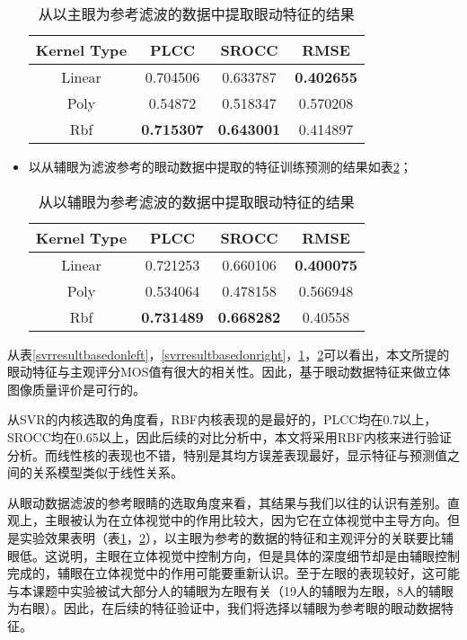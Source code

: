 \begin{itemize}[noitemsep,topsep=0pt,parsep=0pt,partopsep=0pt]
\begin{table}[]
\centering
\caption{从以主眼为参考滤波的数据中提取眼动特征的结果}
\label{svrresultbasedonmaineye}
\begin{tabular}{@{}cccc@{}}
\toprule
Kernel Type & PLCC              & SROCC             & RMSE              \\ \midrule
Linear      & 0.704506          & 0.633787          & \textbf{0.402655} \\
Poly        & 0.54872           & 0.518347          & 0.570208          \\
Rbf         & \textbf{0.715307} & \textbf{0.643001} & 0.414897          \\ \bottomrule
\end{tabular}
\end{table}
\item 以从辅眼为滤波参考的眼动数据中提取的特征训练预测的结果如表\ref{svrresultbasedonnomaineye}；
\begin{table}[]
\centering
\caption{从以辅眼为参考滤波的数据中提取眼动特征的结果}
\label{svrresultbasedonnomaineye}
\begin{tabular}{@{}cccc@{}}
\toprule
Kernel Type & PLCC              & SROCC             & RMSE              \\ \midrule
Linear      & 0.721253          & 0.660106          & \textbf{0.400075} \\
Poly        & 0.534064          & 0.478158          & 0.566948          \\
Rbf         & \textbf{0.731489} & \textbf{0.668282} & 0.40558           \\ \bottomrule
\end{tabular}
\end{table}
\end{itemize}

从表\ref{svrresultbasedonleft}，\ref{svrresultbasedonright}，\ref{svrresultbasedonmaineye}，\ref{svrresultbasedonnomaineye}可以看出，本文所提的眼动特征与主观评分MOS值有很大的相关性。因此，基于眼动数据特征来做立体图像质量评价是可行的。

从SVR的内核选取的角度看，RBF内核表现的是最好的，PLCC均在0.7以上，SROCC均在0.65以上，因此后续的对比分析中，本文将采用RBF内核来进行验证分析。而线性核的表现也不错，特别是其均方误差表现最好，显示特征与预测值之间的关系模型类似于线性关系。

从眼动数据滤波的参考眼睛的选取角度来看，其结果与我们以往的认识有差别。直观上，主眼被认为在立体视觉中的作用比较大，因为它在立体视觉中主导方向。但是实验效果表明（表\ref{svrresultbasedonmaineye}，\ref{svrresultbasedonnomaineye}），以主眼为参考的数据的特征和主观评分的关联要比辅眼低。这说明，主眼在立体视觉中控制方向，但是具体的深度细节却是由辅眼控制完成的，辅眼在立体视觉中的作用可能要重新认识。至于左眼的表现较好，这可能与本课题中实验被试大部分人的辅眼为左眼有关（19人的辅眼为左眼，8人的辅眼为右眼）。因此，在后续的特征验证中，我们将选择以辅眼为参考眼的眼动数据特征。

